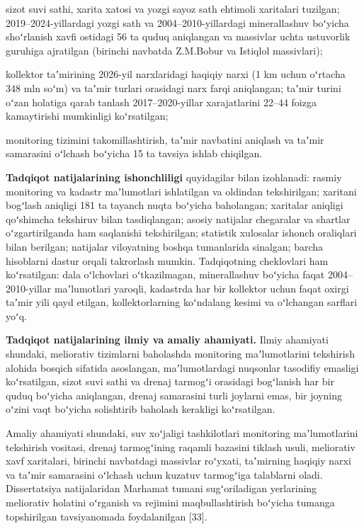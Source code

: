 sizot suvi sathi, xarita xatosi va yozgi sayoz sath ehtimoli xaritalari
tuzilgan; 2019--2024-yillardagi yozgi sath va 2004--2010-yillardagi
minerallashuv boʻyicha shoʻrlanish xavfi ostidagi 56 ta quduq aniqlangan
va massivlar uchta ustuvorlik guruhiga ajratilgan (birinchi navbatda
Z.M.Bobur va Istiqlol massivlari);

kollektor taʼmirining 2026-yil narxlaridagi haqiqiy narxi (1 km uchun
oʻrtacha 348 mln soʻm) va taʼmir turlari orasidagi narx farqi
aniqlangan; taʼmir turini oʻzan holatiga qarab tanlash 2017--2020-yillar
xarajatlarini 22--44 foizga kamaytirishi mumkinligi koʻrsatilgan;

monitoring tizimini takomillashtirish, taʼmir navbatini aniqlash va
taʼmir samarasini oʻlchash boʻyicha 15 ta tavsiya ishlab chiqilgan.

\textbf{Tadqiqot natijalarining ishonchliligi} quyidagilar bilan
izohlanadi: rasmiy monitoring va kadastr maʼlumotlari ishlatilgan va
oldindan tekshirilgan; xaritani bogʻlash aniqligi 181 ta tayanch nuqta
boʻyicha baholangan; xaritalar aniqligi qoʻshimcha tekshiruv bilan
tasdiqlangan; asosiy natijalar chegaralar va shartlar oʻzgartirilganda
ham saqlanishi tekshirilgan; statistik xulosalar ishonch oraliqlari
bilan berilgan; natijalar viloyatning boshqa tumanlarida sinalgan;
barcha hisoblarni dastur orqali takrorlash mumkin. Tadqiqotning
cheklovlari ham koʻrsatilgan: dala oʻlchovlari oʻtkazilmagan,
minerallashuv boʻyicha faqat 2004--2010-yillar maʼlumotlari yaroqli,
kadastrda har bir kollektor uchun faqat oxirgi taʼmir yili qayd etilgan,
kollektorlarning koʻndalang kesimi va oʻlchangan sarflari yoʻq.

\textbf{Tadqiqot natijalarining ilmiy va amaliy ahamiyati.} Ilmiy
ahamiyati shundaki, meliorativ tizimlarni baholashda monitoring
maʼlumotlarini tekshirish alohida bosqich sifatida asoslangan,
maʼlumotlardagi nuqsonlar tasodifiy emasligi koʻrsatilgan, sizot suvi
sathi va drenaj tarmogʻi orasidagi bogʻlanish har bir quduq boʻyicha
aniqlangan, drenaj samarasini turli joylarni emas, bir joyning oʻzini
vaqt boʻyicha solishtirib baholash kerakligi koʻrsatilgan.

Amaliy ahamiyati shundaki, suv xoʻjaligi tashkilotlari monitoring
maʼlumotlarini tekshirish vositasi, drenaj tarmogʻining raqamli bazasini
tiklash usuli, meliorativ xavf xaritalari, birinchi navbatdagi massivlar
roʻyxati, taʼmirning haqiqiy narxi va taʼmir samarasini oʻlchash uchun
kuzatuv tarmogʻiga talablarni oladi. Dissertatsiya natijalaridan
Marhamat tumani sugʻoriladigan yerlarining meliorativ holatini oʻrganish
va rejimini maqbullashtirish boʻyicha tumanga topshirilgan tavsiyanomada
foydalanilgan {[}33{]}.

